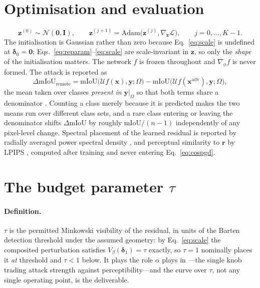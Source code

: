 \documentclass[11pt,a4paper]{article}
\begin{document}
\section{Optimisation and evaluation}

\begin{equation}
  \mathbf{z}^{(0)}\sim\mathcal{N}(\mathbf{0},\mathbf{I}),\qquad
  \mathbf{z}^{(j+1)}=\mathrm{Adam}\big(\mathbf{z}^{(j)},
  \nabla_{\mathbf{z}}\mathcal{L}\big),\qquad j=0,\dots,K-1 .
  \label{eq:opt}
\end{equation}
The initialisation is Gaussian rather than zero because
Eq.~\eqref{eq:scale} is undefined at $\boldsymbol{\delta}_0=\mathbf{0}$;
Eqs.~\eqref{eq:reparam}--\eqref{eq:scale} are scale-invariant in
$\mathbf{z}$, so only the \emph{shape} of the initialisation matters.
The network $f$ is frozen throughout and $\nabla_{\phi}f$ is never
formed. The attack is reported as
\begin{equation}
  \Delta\mathrm{mIoU}_{\mathrm{remote}}
  =\mathrm{mIoU}\big(\mathcal{U}f(\mathbf{x}),\mathbf{y};\Omega\big)
  -\mathrm{mIoU}\big(\mathcal{U}f(\mathbf{x}^{\mathrm{adv}}),\mathbf{y};\Omega\big),
  \label{eq:drop}
\end{equation}
the mean taken over classes \emph{present in} $\mathbf{y}|_\Omega$ so
that both terms share a denominator \citep{cordts2016cityscapes}.
Counting a class merely because it is predicted makes the two means run
over different class sets, and a rare class entering or leaving the
denominator shifts $\Delta\mathrm{mIoU}$ by roughly
$\mathrm{mIoU}/(n-1)$ independently of any pixel-level change. Spectral
placement of the learned residual is reported by radially averaged power
spectral density \citep{ruzanski2011rapsd}, and perceptual similarity to
$\mathbf{r}$ by LPIPS \citep{zhang2018lpips}, computed after training
and never entering Eq.~\eqref{eq:cospgd}.

\section{The budget parameter $\tau$}
\label{sec:tau}

\paragraph{Definition.}
$\tau$ is the permitted Minkowski visibility of the residual, in units
of the Barten detection threshold under the assumed geometry: by
Eq.~\eqref{eq:scale} the composited perturbation satisfies
$V_\beta(\boldsymbol{\delta}_1)=\tau$ exactly, so $\tau=1$ nominally
places it \emph{at} threshold and $\tau<1$ below. It plays the role
$\alpha$ plays in \citet{tan2021lap}---the single knob trading attack
strength against perceptibility---and the curve over $\tau$, not any
single operating point, is the deliverable.
\end{document}
